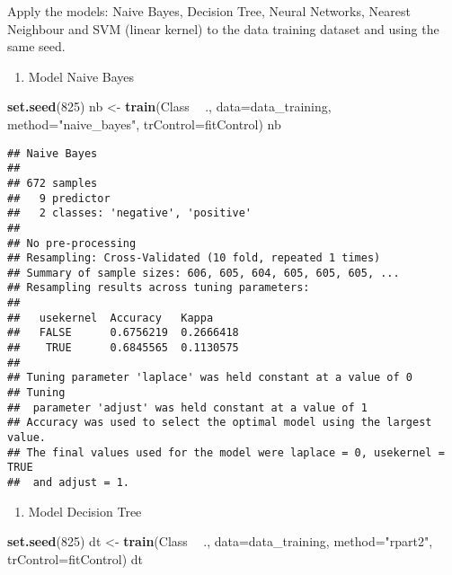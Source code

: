 \documentclass[]{article}
\newenvironment{Shaded}{\begin{snugshade}}{\end{snugshade}}
\newcommand{\DataTypeTok}[1]{\textcolor[rgb]{0.13,0.29,0.53}{#1}}
\newcommand{\DecValTok}[1]{\textcolor[rgb]{0.00,0.00,0.81}{#1}}
\newcommand{\KeywordTok}[1]{\textcolor[rgb]{0.13,0.29,0.53}{\textbf{#1}}}
\newcommand{\NormalTok}[1]{#1}
\newcommand{\OperatorTok}[1]{\textcolor[rgb]{0.81,0.36,0.00}{\textbf{#1}}}
\newcommand{\StringTok}[1]{\textcolor[rgb]{0.31,0.60,0.02}{#1}}
\providecommand{\tightlist}{%
  \setlength{\itemsep}{0pt}\setlength{\parskip}{0pt}}
\begin{document}
Apply the models: Naive Bayes, Decision Tree, Neural Networks, Nearest
Neighbour and SVM (linear kernel) to the data training dataset and using
the same seed.

\begin{enumerate}
\def\labelenumi{\arabic{enumi}.}
\tightlist
\item
  Model Naive Bayes
\end{enumerate}

\begin{Shaded}
\begin{Highlighting}[]
\KeywordTok{set.seed}\NormalTok{(}\DecValTok{825}\NormalTok{)}
\NormalTok{nb <-}\StringTok{ }\KeywordTok{train}\NormalTok{(Class }\OperatorTok{~}\StringTok{ }\NormalTok{., }
            \DataTypeTok{data=}\NormalTok{data_training, }
            \DataTypeTok{method=}\StringTok{"naive_bayes"}\NormalTok{,}
            \DataTypeTok{trControl=}\NormalTok{fitControl)}
\NormalTok{nb}
\end{Highlighting}
\end{Shaded}

\begin{verbatim}
## Naive Bayes 
## 
## 672 samples
##   9 predictor
##   2 classes: 'negative', 'positive' 
## 
## No pre-processing
## Resampling: Cross-Validated (10 fold, repeated 1 times) 
## Summary of sample sizes: 606, 605, 604, 605, 605, 605, ... 
## Resampling results across tuning parameters:
## 
##   usekernel  Accuracy   Kappa    
##   FALSE      0.6756219  0.2666418
##    TRUE      0.6845565  0.1130575
## 
## Tuning parameter 'laplace' was held constant at a value of 0
## Tuning
##  parameter 'adjust' was held constant at a value of 1
## Accuracy was used to select the optimal model using the largest value.
## The final values used for the model were laplace = 0, usekernel = TRUE
##  and adjust = 1.
\end{verbatim}

\begin{enumerate}
\def\labelenumi{\arabic{enumi}.}
\setcounter{enumi}{1}
\tightlist
\item
  Model Decision Tree
\end{enumerate}

\begin{Shaded}
\begin{Highlighting}[]
\KeywordTok{set.seed}\NormalTok{(}\DecValTok{825}\NormalTok{)}
\NormalTok{dt <-}\StringTok{ }\KeywordTok{train}\NormalTok{(Class }\OperatorTok{~}\StringTok{ }\NormalTok{., }
            \DataTypeTok{data=}\NormalTok{data_training, }
            \DataTypeTok{method=}\StringTok{"rpart2"}\NormalTok{,}
            \DataTypeTok{trControl=}\NormalTok{fitControl)}
\NormalTok{dt}
\end{Highlighting}
\end{Shaded}
\end{document}
